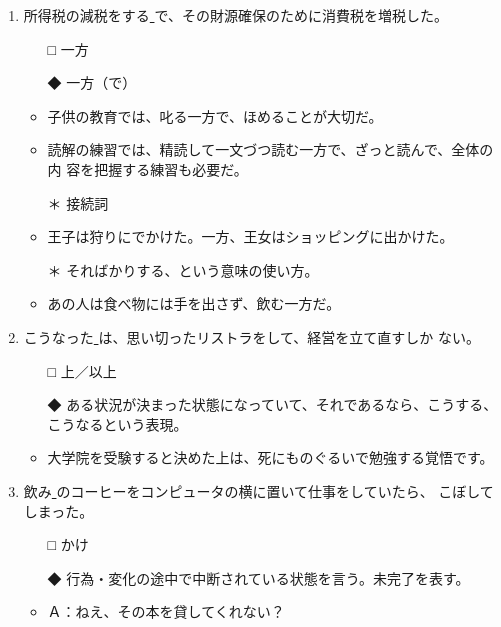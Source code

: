 \documentclass[
uplatex,
b5paper,
10pt,
dvipdfmx
]{jsbook}
\begin{document}
\begin{enumerate}
\item 所得税の減税をする\underline{  }で、その財源確保のために消費税を増税した。
\begin{itemize}
\item[□] 一方
\item[◆] 一方（で）
\end{itemize}
\begin{itemize}
\item 子供の教育では、叱る一方で、ほめることが大切だ。
\item 読解の練習では、精読して一文づつ読む一方で、ざっと読んで、全体の内
      容を把握する練習も必要だ。
\item[＊] 接続詞
\item 王子は狩りにでかけた。一方、王女はショッピングに出かけた。
\item[＊] そればかりする、という意味の使い方。
\item あの人は食べ物には手を出さず、飲む一方だ。
\end{itemize}

\item こうなった\underline{  }は、思い切ったリストラをして、経営を立て直すしか
      ない。
\begin{itemize}
\item[□] 上／以上
\item[◆] ある状況が決まった状態になっていて、それであるなら、こうする、
	  こうなるという表現。
\end{itemize}
\begin{itemize}
\item 大学院を受験すると決めた上は、死にものぐるいで勉強する覚悟です。
\end{itemize}

\item 飲み\underline{  }のコーヒーをコンピュータの横に置いて仕事をしていたら、
      こぼしてしまった。
\begin{itemize}
\item[□] かけ
\item[◆] 行為・変化の途中で中断されている状態を言う。未完了を表す。
\end{itemize}
\begin{itemize}
\item Ａ：ねえ、その本を貸してくれない？


\end{itemize}
\end{enumerate}
\end{document}
